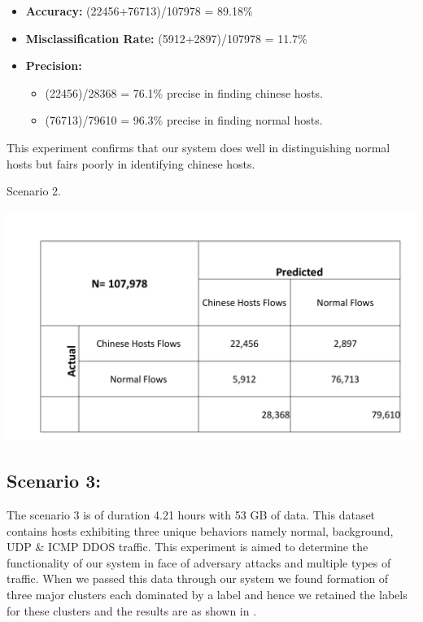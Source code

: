 \begin{itemize}
	\item \textbf{Accuracy:}  (22456+76713)/107978 = 89.18\%
	
	\item \textbf{Misclassification Rate:} (5912+2897)/107978 = 11.7\%
	
	\item \textbf{Precision:} 
	\begin{itemize}	
			
		\item (22456)/28368 = 76.1\% precise in finding chinese hosts.
		
		\item (76713)/79610 = 96.3\% precise in finding normal hosts.
		
	\end{itemize}
	
\end{itemize}

This experiment confirms that our system does well in distinguishing normal hosts but fairs poorly in identifying chinese hosts.

\begin{table}[t]
	\caption{Scenario 2.}%
	\centerline{\includegraphics[scale = 0.45]{scenario2.pdf}}	
\end{table}

\subsection{Scenario 3:}
The scenario 3 is of duration 4.21 hours with 53 GB of data. This dataset contains hosts exhibiting three unique behaviors namely normal, background, UDP \& ICMP DDOS  traffic. This experiment is aimed to determine the functionality of our system in face of adversary attacks and multiple types of traffic. When we passed this data through our system we found formation of three major clusters each dominated by a label and hence we retained the labels for these clusters and the results are as shown in .

